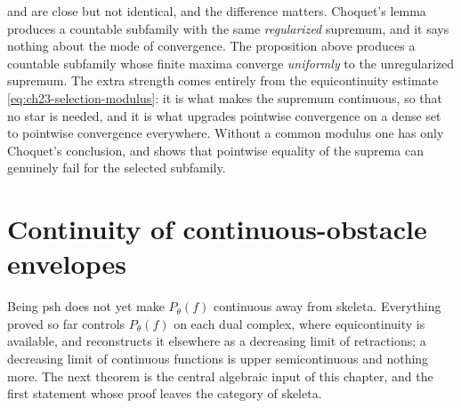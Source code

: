 \begin{remark}
\label{rem:ch23-selection-vs-choquet}
 and
 are close but not identical, and the
difference matters.  Choquet's lemma
 produces a countable subfamily with the same
\emph{regularized} supremum, and it says nothing about the mode of
convergence.  The proposition above produces a countable subfamily whose
finite maxima converge \emph{uniformly} to the unregularized supremum.  The
extra strength comes entirely from the equicontinuity estimate
\eqref{eq:ch23-selection-modulus}: it is what makes the supremum continuous,
so that no star is needed, and it is what upgrades pointwise convergence on
a dense set to pointwise convergence everywhere.  Without a common modulus
one has only Choquet's conclusion, and
 shows that pointwise equality of the
suprema can genuinely fail for the selected subfamily.
\end{remark}

\section{Continuity of continuous-obstacle envelopes}
\label{sec:ch23-continuity}

Being psh does not yet make $P_\theta(f)$ continuous away from skeleta.
Everything proved so far controls $P_\theta(f)$ on each dual complex, where
equicontinuity is available, and reconstructs it elsewhere as a decreasing
limit of retractions; a decreasing limit of continuous functions is upper
semicontinuous and nothing more.  The next theorem is the central algebraic
input of this chapter, and the first statement whose proof leaves the
category of skeleta.

\begin{center}
\end{center}

